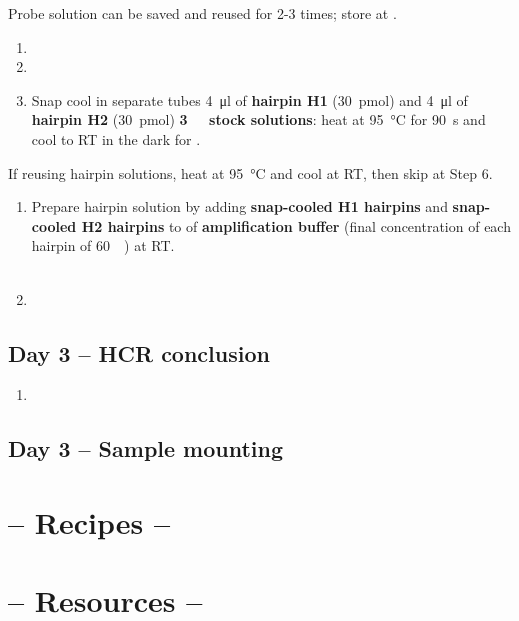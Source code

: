 \documentclass[12pt]{report}
\begin{document}
\bigskip\alert{Probe solution can be saved and reused for 2-3 times; store at \minustwenty.}

\begin{enumerate}[resume = steps]
  \item {}
  \item {}
  \item Snap cool in separate tubes \qty{4}{\ul} of \textbf{hairpin H1} (\qty{30}{\pmol}) and \qty{4}{\ul} of \textbf{hairpin H2} (\qty{30}{\pmol}) \textbf{\qty{3}{\micro\molar} stock solutions}: heat at \qty{95}{\degreeCelsius} for \qty{90}{\s} and cool to RT in the dark for \halfhour.
\end{enumerate}

\bigskip\alert{If reusing hairpin solutions, heat at \qty{95}{\degreeCelsius} and cool at RT, then skip at Step 6.}

\begin{enumerate}[resume = steps]
  \item Prepare hairpin solution by adding \textbf{snap-cooled H1 hairpins} and \textbf{snap-cooled H2 hairpins} to \twohunmicrol{} of \textbf{amplification buffer} (final concentration of each hairpin of \qty{60}{\nano\molar}) at RT.\\
  \\
  \item {}
\end{enumerate}

\subsection*{Day 3 -- HCR conclusion}

\begin{enumerate}[series = steps]
  \item {}
\end{enumerate}


\subsection*{Day 3 -- Sample mounting}

\clearpage

\section*{-- Recipes --}

\blindtext
\clearpage

\section*{-- Resources --}

\blindtext
\clearpage
\end{document}
